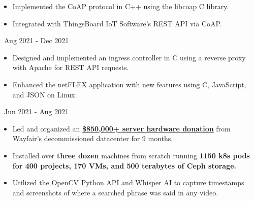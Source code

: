 \documentclass[11pt,letterpaper,ragged2e]{altacv}
\begin{document}
{
  \begin{itemize}
    \item Implemented the CoAP protocol in C++ using the libcoap C library.
    \item Integrated with ThingsBoard IoT Software's REST API via CoAP.
  \end{itemize}
}
{\faCalendar\, Aug 2021 - Dec 2021}
{
}

{
  \begin{itemize}
    \item Designed and implemented an ingress controller in C using a reverse proxy with Apache for REST API requests.
    \item Enhanced the netFLEX application with new features using C, JavaScript, and JSON on Linux.
  \end{itemize}
}
{\faCalendar\, Jun 2021 - Aug 2021}
{
}



{
  \begin{itemize}
    \item Led and organized an \href{https://www.rit.edu/news/wayfair-gifts-850000-servers-rits-computer-science-house}{\textbf{\$850,000+ server hardware donation}} from Wayfair's decommissioned datacenter for 9 months.
    \item Installed over \textbf{three dozen} machines from scratch running \textbf{1150 k8s pods for 400 projects, 170 VMs, and 500 terabytes of Ceph storage.}
  \end{itemize}
}
{
}

{
  \begin{itemize}
    \item Utilized the OpenCV Python API and Whisper AI to capture timestamps and screenshots of where a searched phrase was said in any video.
  \end{itemize}
}
{
}
\end{document}
